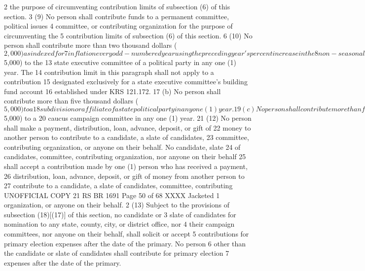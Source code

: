 2 the purpose of circumventing contribution limits of subsection (6) of this section.
3 (9) No person shall contribute funds to a permanent committee, political issues
4 committee, or contributing organization for the purpose of circumventing the
5 contribution limits of subsection (6) of this section.
6 (10) No person shall contribute more than two thousand dollars ($2,000)as indexed for
7 inflation every odd-numbered year using the preceding year's percent increase in the
8 non-seasonally adjusted annual average Consumer Price Index for all Urban
9 Consumers (CPI-U), U.S. City Average, All Items, for that year as published by the
10 United States Bureau of Labor Statistics and rounded to the nearest hundred dollars,
11 to a permanent committee or contributing organization in any one (1) year.
12 (11) (a) No person shall contribute more than five thousand dollars ($5,000) to the
13 state executive committee of a political party in any one (1) year. The
14 contribution limit in this paragraph shall not apply to a contribution
15 designated exclusively for a state executive committee's building fund account
16 established under KRS 121.172.
17 (b) No person shall contribute more than five thousand dollars ($5,000) to a
18 subdivision or affiliate of a state political party in any one (1) year.
19 (c) No person shall contribute more than five thousand dollars ($5,000) to a
20 caucus campaign committee in any one (1) year.
21 (12) No person shall make a payment, distribution, loan, advance, deposit, or gift of
22 money to another person to contribute to a candidate, a slate of candidates,
23 committee, contributing organization, or anyone on their behalf. No candidate, slate
24 of candidates, committee, contributing organization, nor anyone on their behalf
25 shall accept a contribution made by one (1) person who has received a payment,
26 distribution, loan, advance, deposit, or gift of money from another person to
27 contribute to a candidate, a slate of candidates, committee, contributing 
UNOFFICIAL COPY 21 RS BR 1691
Page 50 of 68
XXXX Jacketed
1 organization, or anyone on their behalf.
2 (13) Subject to the provisions of subsection (18)[(17)] of this section, no candidate or
3 slate of candidates for nomination to any state, county, city, or district office, nor
4 their campaign committees, nor anyone on their behalf, shall solicit or accept
5 contributions for primary election expenses after the date of the primary. No person
6 other than the candidate or slate of candidates shall contribute for primary election
7 expenses after the date of the primary.
